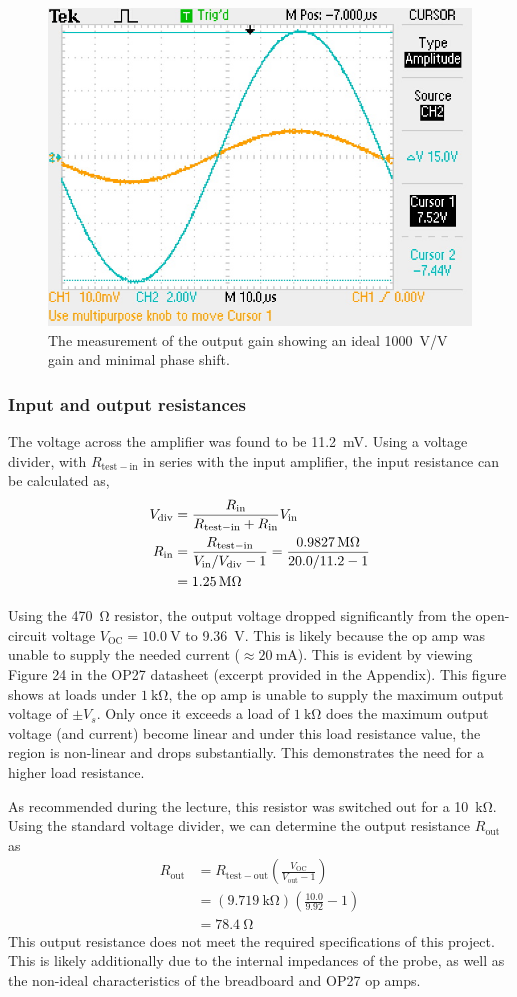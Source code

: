 \documentclass{report}
\begin{document}
	\begin{figure}[h]
		\centering
		\includegraphics[width=0.5\linewidth]{scope/F0005TEK}
		\caption{The measurement of the output gain showing an ideal \SI{1000}{\V/\V} gain and minimal phase shift.}
		\label{fig:f0005tek}
	\end{figure}
	
	\subsubsection{Input and output resistances}
	The voltage across the amplifier was found to be \SI{11.2}{\mV}. Using a voltage divider, with $R_\mathrm{test-in}$ in series with the input amplifier, the input resistance can be calculated as, \begin{align}
		V_\mathrm{div} & = \frac{ R_\mathrm{in} }{R_\mathrm{test-in} + R_\mathrm{in}} V_\mathrm{in} \notag \\
		R_\mathrm{in} & = \frac{R_\mathrm{test-in}}{V_\mathrm{in} / V_\mathrm{div} - 1} = \frac{\SI{0.9827}{\Mohm}}{20.0 / 11.2 - 1} \notag \\
			& = \SI{1.25}{\Mohm} \notag
	\end{align}
	
	Using the \SI{470}{\ohm} resistor, the output voltage dropped significantly from the open-circuit voltage $V_\mathrm{OC}= \SI{10.0}{\V}$ to \SI{9.36}{\V}. This is likely because the op amp was unable to supply the needed current ($\approx \SI{20}{\mA}$). This is evident by viewing Figure 24 in the OP27 datasheet (excerpt provided in the Appendix). This figure shows at loads under $\SI{1}{\kohm}$, the op amp is unable to supply the maximum output voltage of $\pm V_s$. Only once it exceeds a load of $\SI{1}{\kohm}$ does the maximum output voltage (and current) become linear and under this load resistance value, the region is non-linear and drops substantially. This demonstrates the need for a higher load resistance.
	
	As recommended during the lecture, this resistor was switched out for a \SI{10}{\kohm}. Using the standard voltage divider, we can determine the output resistance $R_\mathrm{out}$ as \begin{align*}
		R_\mathrm{out} & = R_\mathrm{test-out} \left(\frac{V_\mathrm{OC}}{V_\mathrm{out} - 1}\right) \\
			& = \left(\SI{9.719}{\kohm}\right) \left( \frac{10.0}{9.92} - 1 \right) \\
			& = \SI{78.4}{\ohm}
	\end{align*}
	This output resistance does not meet the required specifications of this project. This is likely additionally due to the internal impedances of the probe, as well as the non-ideal characteristics of the breadboard and OP27 op amps.
	
\end{document}
